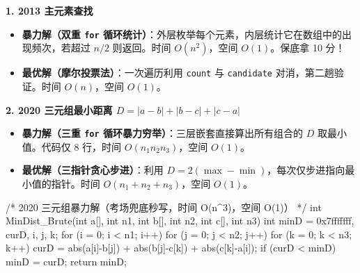 \documentclass[10pt,a4paper]{ctexart}
\begin{document}
\par\addvspace{3pt}\par\addvspace{3pt}


\par\addvspace{2pt}\noindent\textbf{1. 2013 主元素查找}\par

\begin{itemize}

\item \textbf{暴力解（双重 \texttt{for} 循环统计）}：外层枚举每个元素，内层统计它在数组中的出现频次，若超过 $n/2$ 则返回。时间 $O(n^2)$，空间 $O(1)$。保底拿 10 分！

\item \textbf{最优解（摩尔投票法）}：一次遍历利用 \texttt{count} 与 \texttt{candidate} 对消，第二趟验证。时间 $O(n)$，空间 $O(1)$。

\end{itemize}

\par\addvspace{2pt}\noindent\textbf{2. 2020 三元组最小距离 $D = |a-b| + |b-c| + |c-a|$}\par

\begin{itemize}

\item \textbf{暴力解（三重 \texttt{for} 循环暴力穷举）}：三层嵌套直接算出所有组合的 $D$ 取最小值。代码仅 8 行，时间 $O(n_1 n_2 n_3)$，空间 $O(1)$。

\item \textbf{最优解（三指针贪心步进）}：利用 $D = 2(\max - \min)$，每次仅步进指向最小值的指针。时间 $O(n_1 + n_2 + n_3)$，空间 $O(1)$。

\end{itemize}

\begin{codebox}
/* 2020 三元组暴力解（考场兜底秒写，时间 O(n^3)，空间 O(1)） */
int MinDist_Brute(int a[], int n1, int b[], int n2, int c[], int n3) {
    int minD = 0x7fffffff, curD, i, j, k;
    for (i = 0; i < n1; i++) {
        for (j = 0; j < n2; j++) {
            for (k = 0; k < n3; k++) {
                curD = abs(a[i]-b[j]) + abs(b[j]-c[k]) + abs(c[k]-a[i]);
                if (curD < minD) minD = curD;
            }
        }
    }
    return minD;
}
\end{codebox}

\par\addvspace{3pt}\par\addvspace{3pt}
\end{document}
